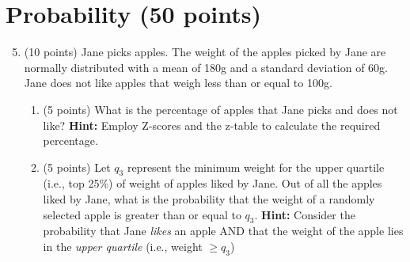 \documentclass{article}%
\begin{document}
\section*{Probability (50 points)}
\begin{enumerate}
    \setcounter{enumi}{4}
    \item (10 points) Jane picks apples. The weight of the apples picked by Jane are normally distributed with a mean of 180g and a standard deviation of 60g. Jane does not like apples that weigh less than or equal to 100g. 
    \begin{enumerate}
        \item (5 points) What is the percentage of apples that Jane picks and does not like? \textbf{Hint:} Employ Z-scores and the z-table to calculate the required percentage.
        \item (5 points) Let $q_3$ represent the minimum weight for the upper quartile (i.e., top 25\%) of weight of apples  liked by Jane. Out of all the apples liked by Jane, what is the probability that the weight of a randomly selected apple is greater than or equal to $q_3$. \textbf{Hint:} Consider the probability that Jane \emph{likes} an apple AND that the weight of the apple lies in the \emph{upper quartile} (i.e., weight $\geq q_3$)
    \end{enumerate}


\end{enumerate}
\end{document}
